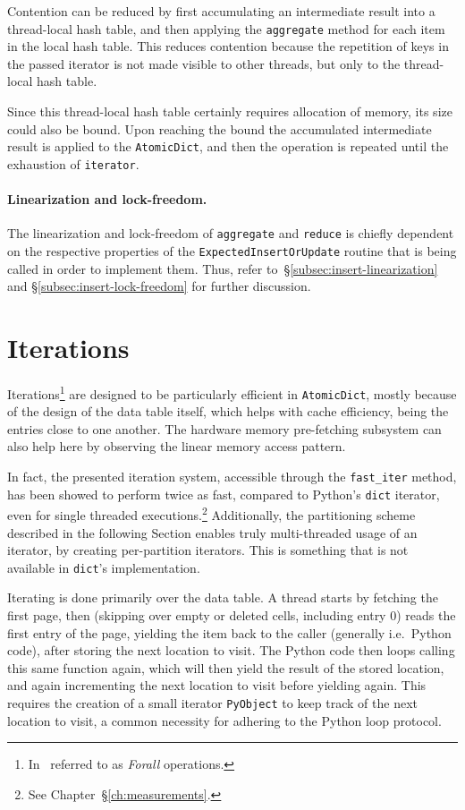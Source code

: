 Contention can be reduced by first accumulating an intermediate result into a thread-local hash table, and then applying the \texttt{aggregate} method for each item in the local hash table.
This reduces contention because the repetition of keys in the passed iterator is not made visible to other threads, but only to the thread-local hash table.

Since this thread-local hash table certainly requires allocation of memory, its size could also be bound.
Upon reaching the bound the accumulated intermediate result is applied to the \texttt{AtomicDict}, and then the operation is repeated until the exhaustion of \texttt{iterator}.


\paragraph{Linearization and lock-freedom.}
The linearization and lock-freedom of \texttt{aggregate} and \texttt{reduce} is chiefly dependent on the respective properties of the \texttt{ExpectedInsertOrUpdate} routine that is being called in order to implement them.
Thus, refer to~\S\ref{subsec:insert-linearization} and \S\ref{subsec:insert-lock-freedom} for further discussion.


\section{Iterations}\label{sec:iterations}

Iterations\footnote{%
	In~\cite{maier} referred to as \emph{Forall} operations.
} are designed to be particularly efficient in \texttt{AtomicDict}, mostly because of the design of the data table itself, which helps with cache efficiency, being the entries close to one another.
The hardware memory pre-fetching subsystem can also help here by observing the linear memory access pattern.

In fact, the presented iteration system, accessible through the \texttt{{fast\_iter}} method, has been showed to perform twice as fast, compared to Python's \texttt{dict} iterator, even for single threaded executions.\footnote{See Chapter~\S\ref{ch:measurements}.}
Additionally, the partitioning scheme described in the following Section enables truly multi-threaded usage of an iterator, by creating per-partition iterators.
This is something that is not available in \texttt{dict}'s implementation.

Iterating is done primarily over the data table.
A thread starts by fetching the first page, then (skipping over empty or deleted cells, including entry 0) reads the first entry of the page, yielding the item back to the caller (generally i.e.\ Python code), after storing the next location to visit.
The Python code then loops calling this same function again, which will then yield the result of the stored location, and again incrementing the next location to visit before yielding again.
This requires the creation of a small iterator \texttt{PyObject} to keep track of the next location to visit, a common necessity for adhering to the Python loop protocol.


